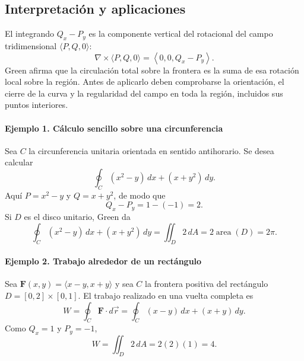 \subsection{Interpretación y aplicaciones}

El integrando $Q_x-P_y$ es la componente vertical del rotacional del campo tridimensional $\langle P,Q,0\rangle$:
\[
\nabla\times\langle P,Q,0\rangle
=\left\langle0,0,Q_x-P_y\right\rangle.
\]
Green afirma que la circulación total sobre la frontera es la suma de esa rotación local sobre la región. Antes de aplicarlo deben comprobarse la orientación, el cierre de la curva y la regularidad del campo en toda la región, incluidos sus puntos interiores.

\paragraph{Ejemplo 1. Cálculo sencillo sobre una circunferencia}
Sea $C$ la circunferencia unitaria orientada en sentido antihorario. Se desea calcular
\[
\oint_C (x^2-y)\,dx+(x+y^2)\,dy.
\]
Aquí $P=x^2-y$ y $Q=x+y^2$, de modo que
\[
Q_x-P_y=1-(-1)=2.
\]
Si $D$ es el disco unitario, Green da
\[
\oint_C (x^2-y)\,dx+(x+y^2)\,dy
=\iint_D2\,dA=2\operatorname{area}(D)=2\pi.
\]

\begingroup
\shorthandoff{>}
\begin{center}
\end{center}
\endgroup

\paragraph{Ejemplo 2. Trabajo alrededor de un rectángulo}
Sea $\mathbf{F}(x,y)=\langle x-y,x+y\rangle$ y sea $C$ la frontera positiva del rectángulo $D=[0,2]\times[0,1]$. El trabajo realizado en una vuelta completa es
\[
W=\oint_C\mathbf{F}\cdot d\vec r
=\oint_C(x-y)\,dx+(x+y)\,dy.
\]
Como $Q_x=1$ y $P_y=-1$,
\[
W=\iint_D2\,dA=2(2)(1)=4.
\]


